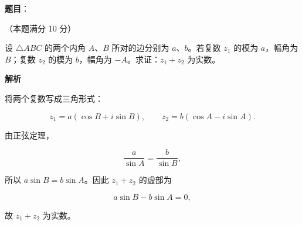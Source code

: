 \begin{answer}

\textbf{题目}：

（本题满分 10 分）

设 $\triangle ABC$ 的两个内角 $A\text{、}B$ 所对的边分别为 $a\text{、}b$。若复数 $z_1$ 的模为 $a$，幅角为 $B$；复数 $z_2$ 的模为 $b$，幅角为 $-A$。求证：$z_1+z_2$ 为实数。

\textbf{解析}

将两个复数写成三角形式：

\nopagebreak[4]
\[
z_1=a(\cos B+i\sin B),\qquad
z_2=b(\cos A-i\sin A).
\]

由正弦定理，

\nopagebreak[4]
\[
\frac a{\sin A}=\frac b{\sin B},
\]

所以 $a\sin B=b\sin A$。因此 $z_1+z_2$ 的虚部为

\nopagebreak[4]
\[
a\sin B-b\sin A=0,
\]

故 $z_1+z_2$ 为实数。


\end{answer}

